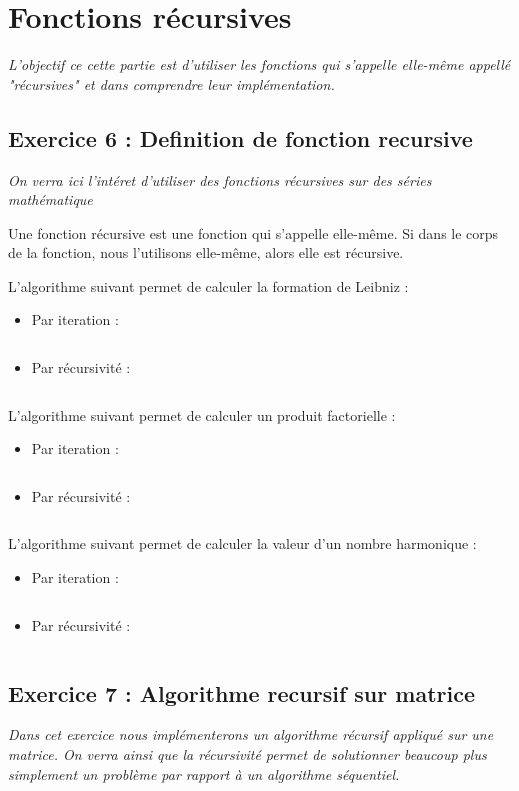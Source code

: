 \section{Fonctions récursives}
\textit{L’objectif ce cette partie est d’utiliser les fonctions qui s’appelle elle-même appellé "récursives" et dans comprendre leur implémentation.}

\subsection{Exercice 6 : Definition de fonction recursive}
\textit{On verra ici l'intéret d'utiliser des fonctions récursives sur des séries mathématique}

Une fonction récursive est une fonction qui s'appelle elle-même. Si dans le corps de la fonction, nous l'utilisons elle-même, alors elle est récursive.

L'algorithme suivant permet de calculer la formation de Leibniz :

\begin{itemize}
\item Par iteration :
\inputminted[linenos,firstline=7, lastline=14]{cpp}{../cpp/TP1-2/piLeibniz.c}
\item Par récursivité :
\inputminted[linenos,firstline=16, lastline=19]{cpp}{../cpp/TP1-2/piLeibniz.c}
\end{itemize}

L'algorithme suivant permet de calculer un produit factorielle :

\begin{itemize}
\item Par iteration :
\inputminted[linenos,firstline=7, lastline=14]{cpp}{../cpp/TP1-2/factorielle.c}
\item Par récursivité :
\inputminted[linenos,firstline=16, lastline=21]{cpp}{../cpp/TP1-2/factorielle.c}
\end{itemize}

L'algorithme suivant permet de calculer la valeur d'un nombre harmonique :

\begin{itemize}
\item Par iteration :
\inputminted[linenos,firstline=7, lastline=14]{cpp}{../cpp/TP1-2/harmonique.c}
\item Par récursivité :
\inputminted[linenos,firstline=16, lastline=21]{cpp}{../cpp/TP1-2/harmonique.c}
\end{itemize}

\subsection{Exercice 7 : Algorithme recursif sur matrice}
\textit{Dans cet exercice nous implémenterons un algorithme récursif appliqué sur une matrice. On verra ainsi que la récursivité permet de solutionner beaucoup plus simplement un problème par rapport à un algorithme séquentiel.}

